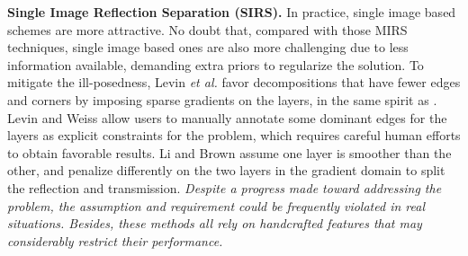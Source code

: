 \documentclass{article}
\begin{document}
\textbf{Single Image Reflection Separation (SIRS).}
In practice, single image based schemes are more attractive. No doubt that, compared with those MIRS techniques, single image based ones are also more challenging due to less information available, demanding extra priors to regularize the solution. To mitigate the ill-posedness, Levin \emph{et al.} \cite{DBLP:conf/cvpr/LevinZW04, DBLP:conf/nips/LevinZW02} favor decompositions that have fewer edges and corners by imposing sparse gradients on the layers, in the same spirit as \cite{DBLP:journals/tog/Freeman15}. Levin and Weiss \cite{DBLP:journals/pami/LevinW07} allow users to manually annotate some dominant edges for the layers as explicit constraints for the problem, which requires careful human efforts to obtain favorable results. Li and Brown \cite{DBLP:conf/cvpr/LiB14} assume one layer is smoother than the other, and penalize differently on the two layers in the gradient domain to split the reflection and transmission. \emph{Despite a progress made toward addressing the problem, the assumption and requirement could be frequently violated in real situations. Besides, these methods all rely on handcrafted features that may considerably restrict their performance.}
\end{document}
